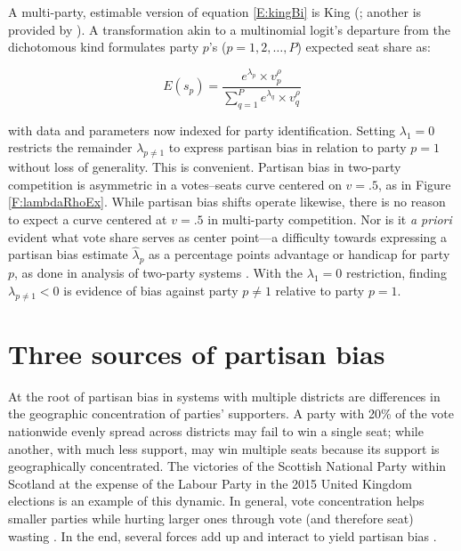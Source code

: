 \documentclass[letter,12pt]{article}
\begin{document}

A multi-party, estimable version of equation \ref{E:kingBi} is King (\citeyear{king.1990elRespBiasMultiparty}; another is provided by \citeauthor{calvo.micozzi.govReform.2005} \citeyear{calvo.micozzi.govReform.2005}). A transformation akin to a multinomial logit's departure from the dichotomous kind formulates party $p$'s ($p=1,2,\ldots,P$) expected seat share as:

\begin{equation}\label{E:kingMulti}
 E(s_p) = \frac{e^{\lambda_p} \times v_p^\rho}{\sum_{q=1}^{P} e^{\lambda_q} \times v_q^\rho}
\end{equation}

\noindent with data and parameters now indexed for party identification. Setting $\lambda_1 = 0$ restricts the remainder $\lambda_{p \neq 1}$ to express partisan bias in relation to party $p=1$ without loss of generality. This is convenient. Partisan bias in two-party competition is asymmetric in a votes--seats curve centered on $v=.5$, as in Figure \ref{F:lambdaRhoEx}. While partisan bias shifts operate likewise, there is no reason to expect a curve centered at $v=.5$ in multi-party competition. Nor is it \emph{a priori} evident what vote share serves as center point---a difficulty towards expressing a partisan bias estimate $\hat{\lambda}_p$ as a percentage points advantage or handicap for party $p$, as done in analysis of two-party systems \citep[e.g.,][]{cox.katz.2002}. With the $\lambda_1 = 0$ restriction, finding $\lambda_{p \neq 1}<0$ is evidence of bias against party $p \neq 1$ relative to party $p=1$.

\section{Three sources of partisan bias}

At the root of partisan bias in systems with multiple districts are differences in the geographic concentration of parties' supporters. A party with 20\% of the vote nationwide evenly spread across districts may fail to win a single seat; while another, with much less support, may win multiple seats because its support is geographically concentrated. The victories of the Scottish National Party within Scotland at the expense of the Labour Party in the 2015 United Kingdom elections is an example of this dynamic. In general, vote concentration helps smaller parties while hurting larger ones through vote (and therefore seat) wasting \citep{calvo.roddenMultipartyPlurality2015}. In the end, several forces add up and interact to yield partisan bias \citep{gudgin.taylor.1980decomposeBias}. 
\end{document}
